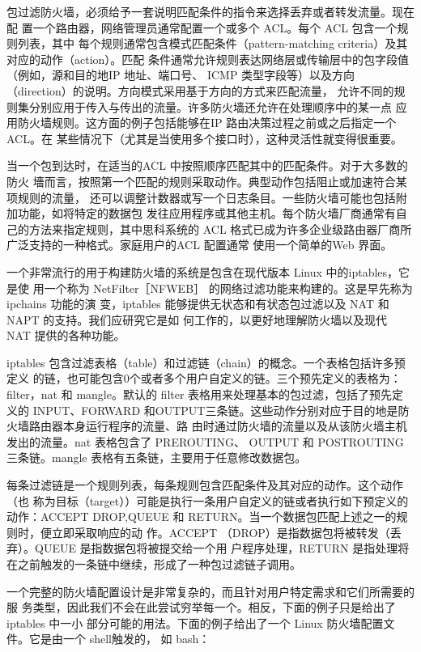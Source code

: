 包过滤防火墙，必须给予一套说明匹配条件的指令来选择丢弃或者转发流量。现在配
置一个路由器，网络管理员通常配置一个或多个 ACL。每个 ACL 包含一个规则列表，其中
每个规则通常包含模式匹配条件（pattern-matching criteria）及其对应的动作（action）。匹配
条件通常允许规则表达网络层或传输层中的包字段值（例如，源和目的地IP 地址、端口号、
ICMP 类型字段等）以及方向（direction）的说明。方向模式采用基于方向的方式来匹配流量，
允许不同的规则集分别应用于传入与传出的流量。许多防火墙还允许在处理顺序中的某一点
应用防火墙规则。这方面的例子包括能够在IP 路由决策过程之前或之后指定一个ACL。在
某些情况下（尤其是当使用多个接口时），这种灵活性就变得很重要。

当一个包到达时，在适当的ACL 中按照顺序匹配其中的匹配条件。对于大多数的防火
墻而言，按照第一个匹配的规则采取动作。典型动作包括阻止或加速符合某项规则的流量，
还可以调整计数器或写一个日志条目。一些防火墙可能也包括附加功能，如将特定的数据包
发往应用程序或其他主机。每个防火墙厂商通常有自己的方法来指定规则，其中思科系统的
ACL 格式已成为许多企业级路由器厂商所广泛支持的一种格式。家庭用户的ACL 配置通常
使用一个简单的Web 界面。

一个非常流行的用于构建防火墙的系统是包含在现代版本 Linux 中的iptables，它是使
用一个称为 NetFilter［NFWEB］ 的网络过滤功能来构建的。这是早先称为 ipchains 功能的演
变，iptables 能够提供无状态和有状态包过滤以及 NAT 和 NAPT 的支持。我们应研究它是如
何工作的，以更好地理解防火墙以及现代 NAT 提供的各种功能。

iptables 包含过滤表格（table）和过滤链（chain）的概念。一个表格包括许多预定义
的链，也可能包含0个或者多个用户自定义的链。三个预先定义的表格为：filter，nat 和
mangle。默认的 filter 表格用来处理基本的包过滤，包括了预先定义的 INPUT、FORWARD
和OUTPUT三条链。这些动作分别对应于目的地是防火墙路由器本身运行程序的流量、路
由时通过防火墙的流量以及从该防火墙主机发出的流量。nat 表格包含了 PREROUTING、
OUTPUT 和 POSTROUTING三条链。mangle 表格有五条链，主要用于任意修改数据包。

每条过滤链是一个规则列表，每条规则包含匹配条件及其对应的动作。这个动作（也
称为目标（target））可能是执行一条用户自定义的链或者执行如下预定义的动作：ACCEPT
DROP,QUEUE 和 RETURN。当一个数据包匹配上述之一的规则时，便立即采取响应的动
作。ACCEPT （DROP）是指数据包将被转发（丢弃）。QUEUE 是指数据包将被提交给一个用
户程序处理，RETURN 是指处理将在之前触发的一条链中继续，形成了一种包过滤链子调用。

一个完整的防火墙配置设计是非常复杂的，而且针对用户特定需求和它们所需要的服
务类型，因此我们不会在此尝试穷举每一个。相反，下面的例子只是给出了 iptables 中一小
部分可能的用法。下面的例子给出了一个 Linux 防火墙配置文件。它是由一个 shell触发的，
如 bash：


